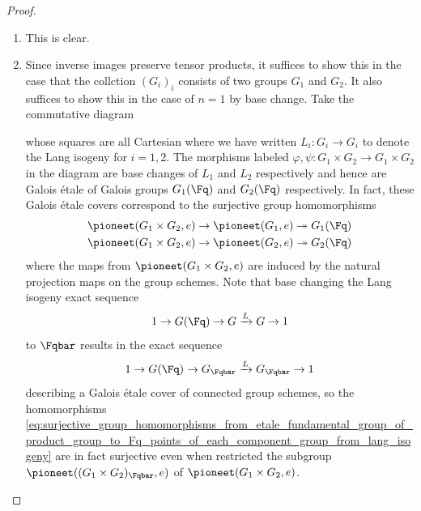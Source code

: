 \begin{proof}
    \begin{enumerate}
        \item This is clear. 
        \item Since inverse images preserve tensor products, it suffices to show this in the case that the collction $(G_i)_{i}$ consists of two groups $G_1$ and $G_2$. It also suffices to show this in the case of $n = 1$ by base change. Take the commutative diagram
        \begin{center}
        \end{center}
        whose squares are all Cartesian where we have written $L_i: G_i \to G_i$ to denote the Lang isogeny for $i = 1,2$. The morphisms labeled $\varphi, \psi: G_1 \times G_2 \to G_1 \times G_2$ in the diagram are base changes of $L_1$ and $L_2$ respectively and hence are Galois \'etale of Galois groups $G_1(\Fq)$ and $G_2(\Fq)$ respectively. In fact, these Galois \'etale covers correspond to the surjective group homomorphisms
        \begin{align} \label{eq:surjective_group_homomorphisms_from_etale_fundamental_group_of_product_group_to_Fq_points_of_each_component_group_from_lang_isogeny}
           \pioneet(G_{1} \times G_2, e) \to   \pioneet(G_{1}, e) &\twoheadrightarrow G_1(\Fq) \\
            \pioneet(G_{1} \times G_2, e) \to \pioneet(G_{2}, e) &\twoheadrightarrow G_2(\Fq) \nonumber
        \end{align}
        where the maps from $\pioneet(G_{1} \times G_2, e)$ are induced by the natural projection maps on the group schemes. Note that base changing the Lang isogeny exact sequence 
        $$1 \to G(\Fq) \to G \xrightarrow{L} G \to 1$$
        to $\Fqbar$ results in the exact sequence
        $$1 \to G(\Fq) \to G_{\Fqbar} \xrightarrow{L} G_{\Fqbar} \to 1$$
        describing a Galois \'etale cover of connected group schemes, so the homomorphisms \eqref{eq:surjective_group_homomorphisms_from_etale_fundamental_group_of_product_group_to_Fq_points_of_each_component_group_from_lang_isogeny} are in fact surjective even when restricted the subgroup $\pioneet((G_1 \times G_2)_{\Fqbar}, e)$ of $\pioneet(G_1 \times G_2, e)$.  


\end{enumerate}
\end{proof}
